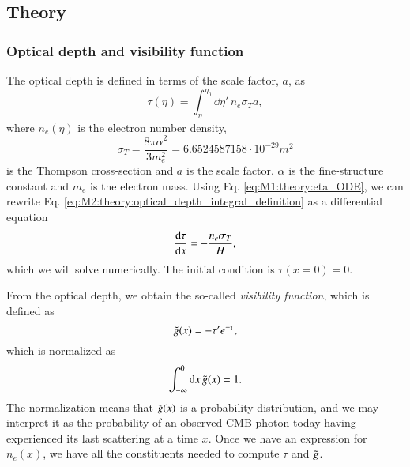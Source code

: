 

\subsection{Theory}\label{ssec:M2:theory}

\subsubsection{Optical depth and visibility function} \label{sssec:M2:optical_depth_and_visibility_function}

The optical depth is defined in terms of the scale factor, $a$, as 
\begin{equation} \label{eq:M2:theory:optical_depth_integral_definition}
    \tau(\eta) = \int_\eta^{\eta_0} \dd \eta' \,n_e \sigma_T a,
\end{equation}
where $n_e(\eta)$ is the electron number density,
\begin{equation} \label{eq:M2:theory:thomspon_cross_section}
    \sigma_T=\frac{8\pi\alpha^2}{3 m_e^2} = 6.6524587158\cdot 10^{-29}\unit{m^2} 
\end{equation}
is the Thompson cross-section and $a$ is the scale factor. $\alpha$ is the fine-structure constant and $m_e$ is the electron mass. Using Eq. \eqref{eq:M1:theory:eta_ODE}, we can rewrite Eq. \eqref{eq:M2:theory:optical_depth_integral_definition} as a differential equation 
\begin{equation} \label{eq:M2:theory:tau_ODE}
    \dv{\tau}{x} = - \frac{n_e \sigma_T}{H},
\end{equation}
which we will solve numerically. The initial condition is $\tau(x=0)=0$.

From the optical depth, we obtain the so-called \textit{visibility function}, which is defined as 
\begin{equation} \label{eq:M2:theory:g_tilde_of_x_definition}
    \tilde{g}(x) = -\tau' e^{-\tau},
\end{equation}
which is normalized as 
\begin{equation} \label{eq:M2:theory:g_tilde_normalization}
    \int_{-\infty}^0\dd x\,\tilde{g}(x) = 1.
\end{equation}
The normalization means that $\tilde{g}(x)$ is a probability distribution, and we may interpret it as the probability of an observed CMB photon today having experienced its last scattering at a time $x$.  Once we have an expression for $n_e(x)$, we have all the constituents needed to compute $\tau$ and $\tilde{g}$.

